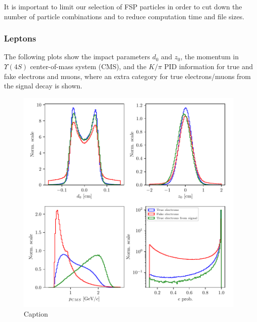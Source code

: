 \documentclass[oneside,a4paper,openany,12pt]{scrbook}
\begin{document}
It is important to limit our selection of FSP particles in order to cut down the number of particle combinations and to reduce computation time and file sizes.

\subsubsection{Leptons}

The following plots show the impact parameters $d_0$ and $z_0$, the momentum in  $\Upsilon(4S)$ center-of-mass system (CMS), and the $K/\pi$ PID information for true and fake electrons and muons, where an extra category for true electrons/muons from the signal decay is shown.

\begin{figure}[!h]
\centering
\includegraphics[scale=1]{fig/FSP_e_vars}
\caption{Caption}
\end{figure}
\end{document}
